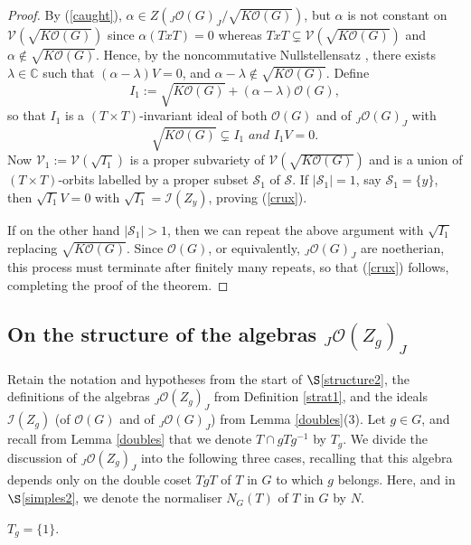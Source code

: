 \documentclass{amsart}
\numberwithin{equation}{section}
\theoremstyle{definition}
\begin{document}
\begin{proof}
By (\ref{caught}), $\alpha \in Z\left({}_J\mathcal{O}(G)_J/\sqrt{K\mathcal{O}(G)}\right)$, but $\alpha$ is not constant on $\mathcal{V}(\sqrt{K\mathcal{O}(G)})$ since $\alpha(TxT) = 0$ whereas $TxT \subsetneq \mathcal{V}(\sqrt{K\mathcal{O}(G)})$ and $\alpha \notin \sqrt{K\mathcal{O}(G)}$. Hence, by the noncommutative Nullstellensatz \cite[Proposition 9.1.7]{McCR}, there exists $\lambda \in \mathbb{C}$ such that $(\alpha - \lambda)V = 0$, and $\alpha - \lambda \notin \sqrt{K\mathcal{O}(G)}$. Define 
$$ I_1:= \sqrt{K\mathcal{O}(G)} + (\alpha - \lambda)\mathcal{O}(G), $$
so that $I_1$ is a $(T \times T)$-invariant ideal of both $\mathcal{O}(G)$ and of ${}_J\mathcal{O}(G)_J$ with 
$$ \sqrt{K\mathcal{O}(G)} \subsetneq I_1 \textit{  and  } I_1V = 0. $$
Now $\mathcal{V}_1 := \mathcal{V}(\sqrt{I_1})$ is a proper subvariety of $\mathcal{V}(\sqrt{K\mathcal{O}(G)})$ and is a union of $(T \times T)$-orbits labelled by a proper subset $\mathcal{S}_1$ of $\mathcal{S}$. If $|\mathcal{S}_1| = 1$, say $\mathcal{S}_1 = \{y \}$, then $\sqrt{I_1} V = 0$ with $\sqrt{I_1} = \mathcal{I}(Z_{y}) $, proving (\ref{crux}).

If on the other hand $|\mathcal{S}_1| > 1$, then we can repeat the above argument with $\sqrt{I_1}$ replacing $\sqrt{K\mathcal{O}(G)}$. Since $\mathcal{O}(G)$, or equivalently, ${}_J\mathcal{O}(G)_J$ are noetherian, this process must terminate after finitely many repeats, so that (\ref{crux}) follows, completing the proof of the theorem.   
\end{proof}

\subsection{On the structure of the algebras ${}_J\mathcal{O}(Z_g)_J$}\label{stratstruc}

Retain the notation and hypotheses from the start of $\S$\ref{structure2}, the definitions of the algebras ${}_J\mathcal{O}(Z_g)_J$ from Definition \ref{strat1}, and the ideals $\mathcal{I}(Z_g)$ (of $\mathcal{O}(G)$ and of ${}_J\mathcal{O}(G)_J$) from Lemma \ref{doubles}(3).  Let $g \in G$, and recall from Lemma \ref{doubles} that we denote $T \cap gTg^{-1}$ by $T_g$. We divide the discussion of ${}_J\mathcal{O}(Z_g)_J$ into the following three cases, recalling that this algebra depends only on the double coset $TgT$ of $T$ in $G$ to which $g$ belongs. Here, and in $\S$\ref{simples2}, we denote the normaliser $N_G(T)$ of $T$ in $G$ by $N$.
\medskip

 $T_g = \{1\}$.
\medskip
\end{document}
